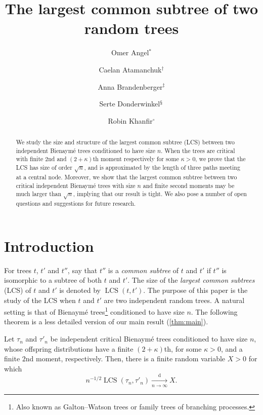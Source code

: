 \documentclass[11pt,reqno]{amsart}
\title{The largest common subtree of two random trees}
\author[O.~Angel]{Omer Angel$^*$}
\author[C.~Atamanchuk]{Caelan Atamanchuk$^\dagger$}
\author[A.~Brandenberger]{Anna Brandenberger$^\ddagger$}
\author[S.~Donderwinkel]{ Serte Donderwinkel$^\mathsection$}
\author[R.~Khanfir]{Robin Khanfir$^\circ$}
\newcommand{\LCS}{\operatorname{LCS}}
\begin{document}



\begin{abstract}
  We study the size and structure of the largest common subtree (LCS) between two independent Bienaym\'{e} trees conditioned to have size $n$.
  When the trees are critical with finite $2$nd and $(2+\kappa)$th moment respectively for some $\kappa>0$, we prove that the LCS has size of order $\sqrt{n}$, and is approximated by the length of three paths meeting at a central node. Moreover, we show that the largest common subtree between two critical independent Bienaymé trees with size $n$ and finite second moments may be much larger than $\sqrt{n}$, implying that our result is tight. We also pose a number of open questions and suggestions for future research.
\end{abstract}

\maketitle 


\section{Introduction}


For trees $t$, $t'$ and $t''$, say that $t''$ is a \emph{common subtree} of $t$ and $t'$ if $t''$ is isomorphic to a subtree of both $t$ and $t'$.
The size of the \emph{largest common subtrees} (LCS) of $t$ and $t'$ is denoted by $\LCS(t,t')$.
The purpose of this paper is the study of the LCS when $t$ and $t'$ are two independent random trees.
A natural setting is that of Bienaym\'e trees\footnote{Also known as Galton--Watson trees or family trees of branching processes.} conditioned to have size $n$.
The following theorem is a less detailed version of our main result (\cref{thm:main}).

\begin{thm}
  Let $\tau_n$ and $\tau'_n$ be independent critical Bienaymé trees conditioned to have size $n$, whose offspring distributions have a finite $(2+\kappa)$th, for some $\kappa>0$, and a finite $2$nd moment, respectively.
  Then, there is a finite random variable $X>0$ for which
  \[ n^{-1/2} \LCS(\tau_n,\tau'_n) \xrightarrow[n\to\infty]{\mathrm d} X. \] 
\end{thm}
\end{document}

